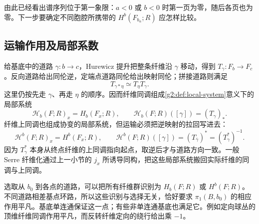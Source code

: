 \ProseParagraphBreak

由此已经看出谱序列位于第一象限：\(a<0\) 或 \(b<0\) 时第一页为零，随后各页也为零。下一步要确定不同胞腔所携带的 \(H^b(F_{b_\alpha};R)\) 应怎样比较。

\subsection{运输作用及局部系数}
\label{g2:subsec:1101:03}

给基底中的道路 \(\gamma:b\to c\)，Hurewicz 提升把整条纤维沿 \(\gamma\) 移动，得到 \(T_\gamma:F_b\to F_c\)。反向道路给出同伦逆，定端点道路同伦给出映射同伦；拼接道路则满足
\[
	T_{\gamma*\eta}\simeq T_\eta T_\gamma.
\]
这里仍按先走 \(\gamma\)、再走 \(\eta\) 的顺序。因而纤维同调组成\cref{g2:def:local-system}意义下的局部系统
\[
	\mathcal H_b(F;R)_x=H_b(F_x;R),\qquad
	\mathcal H_b(F;R)([\gamma])=(T_\gamma)_*.
\]
纤维上同调也组成协变的局部系统，但运输必须把逆映射的拉回写进去：
\begin{equation}\label{g2:eq:serre-cohomology-transport}
	\mathcal H^b(F;R)_x=H^b(F_x;R),\qquad
	\mathcal H^b(F;R)([\gamma])=(T_{\bar\gamma})^*=(T_\gamma^*)^{-1}.
\end{equation}
因为 \(T_\gamma^*\) 本身从终点纤维的上同调指向起点，取逆后才与道路方向一致。一般 Serre 纤维化通过上一小节的 \(j_x\) 所诱导同构，把这些局部系统搬回实际纤维的同调与上同调。

\ProseParagraphBreak

选取从 \(b_0\) 到各点的道路，可以把所有纤维群识别为 \(H_b(F;R)\) 或 \(H^b(F;R)\)。不同道路相差基点环路，所以这些识别与选择无关，恰好要求 \(\pi_1(B,b_0)\) 的相应作用平凡。基底单连通保证这一点；有些非单连通基底也满足它。例如定向球丛的顶维纤维同调作用平凡，而反转纤维定向的绕行给出乘 \(-1\)。

